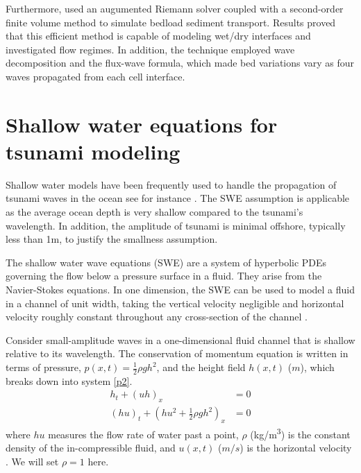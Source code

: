 \documentclass[11pt,a4paper]{article}
\newcommand{\donna}[1]{{\color{red}{#1}}}
\begin{document}
				
			Furthermore, \citet{barzgaran2019numerical}  used an augumented Riemann solver coupled with a second-order finite volume method to simulate bedload sediment transport. Results proved that this efficient method is capable of modeling wet/dry interfaces and investigated flow regimes. In addition, the technique employed wave decomposition and the flux-wave formula, which made bed variations vary as four waves propagated from each cell interface.
			
			


	\section{Shallow water equations for tsunami modeling}
	Shallow water models have been frequently used to handle the propagation of tsunami waves in the ocean see for instance \citet{dutykh2007water,le-ge-be:2011,dias2007dynamics}. The SWE assumption is applicable as the average ocean depth is very shallow compared to the tsunami's wavelength. In addition, the amplitude of tsunami is minimal offshore, typically less than 1m, to justify the smallness \donna{shallowness?} assumption. 
	
		The shallow water wave equations (SWE) are a system of hyperbolic PDEs governing the flow below a pressure surface in a fluid. They arise from the Navier-Stokes equations.  In one dimension, the SWE  can be used to model a fluid in a channel of unit width, taking the vertical velocity negligible and horizontal velocity roughly constant throughout any cross-section of the channel \cite{ge:2008}.  
		
		Consider small-amplitude waves in a one-dimensional fluid channel that is shallow relative to its wavelength. The conservation of momentum equation is written in terms of pressure, $p(x,t) = \frac{1}{2}\rho gh^{2}$, and the height field $h(x,t)$ ($m$), which breaks down into system \eqref{p2}.
	\begin{equation}
		\begin{aligned}
			h_{t} + (uh)_x &= 0 \\
			(hu)_t + \left(hu^{2} + \frac{1}{2}\rho gh^{2} \right)_x & = 0 
		\end{aligned}
		\label{p2}
	\end{equation}	
	where $hu$ measures the flow rate of water past a point,  $\rho$ (\si{\kg/\m^3}) is the constant density of the in-compressible fluid, and $u(x,t)$ ($m/s$) is the horizontal velocity \cite{chaabelasri1849simple} \donna{Is this really where someone would go to learn more about shallow water wave equations?  Toro or LeVeque would be better references.}.  We will set $\rho = 1$ here.
	
\end{document}
